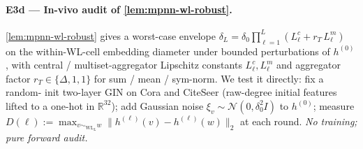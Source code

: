 \documentclass[10pt]{article}
\theoremstyle{definition}
\theoremstyle{remark}
\begin{document}
\paragraph{E3d --- In-vivo audit of \cref{lem:mpnn-wl-robust}.}
\cref{lem:mpnn-wl-robust} gives a worst-case envelope
$\delta_{L} = \delta_{0} \prod_{\ell=1}^{L}
   (L_{\ell}^{c} + r_{T}\, L_{\ell}^{m})$
on the within-WL-cell embedding diameter under bounded
perturbations of $h^{(0)}$, with central / multiset-aggregator
Lipschitz constants $L_{\ell}^{c}, L_{\ell}^{m}$ and aggregator
factor $r_{T} \in \{\Delta, 1, 1\}$ for sum / mean / sym-norm.
We test it directly: fix a random-
init two-layer GIN on Cora and CiteSeer (raw-degree initial
features lifted to a one-hot in $\mathbb{R}^{32}$); add
Gaussian noise $\xi_{v} \sim \mathcal{N}(0, \delta_{0}^{2} I)$
to $h^{(0)}$; measure
$D(\ell) := \max_{v \sim_{\mathrm{WL}_{L}} w} \|h^{(\ell)}(v) -
h^{(\ell)}(w)\|_{2}$ at each round. \emph{No training; pure
forward audit.}
\end{document}
